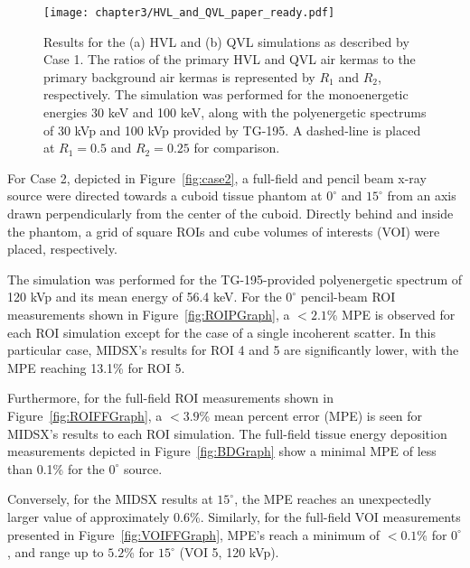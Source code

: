 \begin{figure}[H]
    \centering
	\texttt{[image: chapter3/HVL\_and\_QVL\_paper\_ready.pdf]}
	\caption{Results for the (a) HVL and (b) QVL simulations as described by Case 1. The ratios of the primary HVL and QVL air kermas to the primary background air kermas is represented by $R_1$ and $R_2$, respectively. The simulation was performed for the monoenergetic energies 30 keV and 100 keV, along with the polyenergetic spectrums of 30 kVp and 100 kVp provided by TG-195. A dashed-line is placed at $R_1 = 0.5$ and $R_2 = 0.25$ for comparison.}
	\label{fig:HVLGraph}
\end{figure}

\par For Case 2, depicted in Figure~\ref{fig:case2}, a full-field and pencil beam x-ray source were
\linebreak directed towards a cuboid tissue phantom at $0^\circ$ and $15^\circ$ from an axis drawn perpendicularly from the center of the cuboid. Directly behind and inside the phantom, a grid of square ROIs and cube volumes of interests (VOI) were placed, respectively.
\par The simulation was performed for the TG-195-provided polyenergetic spectrum of 120 kVp and its mean energy of 56.4 keV. For the $0^\circ$ pencil-beam ROI measurements shown in Figure~\ref{fig:ROIPGraph}, a $<2.1$\% MPE is observed for each ROI simulation except for the case of a single incoherent scatter. In this particular case, MIDSX's results for ROI 4 and 5 are significantly lower, with the MPE reaching 13.1\% for ROI 5. 
\par Furthermore, for the full-field ROI measurements shown in Figure~\ref{fig:ROIFFGraph}, a $<3.9$\% mean percent error (MPE) is seen for MIDSX's results to each ROI simulation. The full-field tissue energy deposition measurements depicted in Figure~\ref{fig:BDGraph} show a minimal MPE of less than 0.1\% for the $0^\circ$ source. 
\par Conversely, for the MIDSX results at $15^\circ$, the MPE reaches an unexpectedly larger value of approximately 0.6\%. Similarly, for the full-field VOI measurements presented in Figure~\ref{fig:VOIFFGraph}, MPE's reach a minimum of $<0.1$\% for $0^\circ$, and range up to $5.2$\% for $15^\circ$ (VOI 5, 120 kVp).

